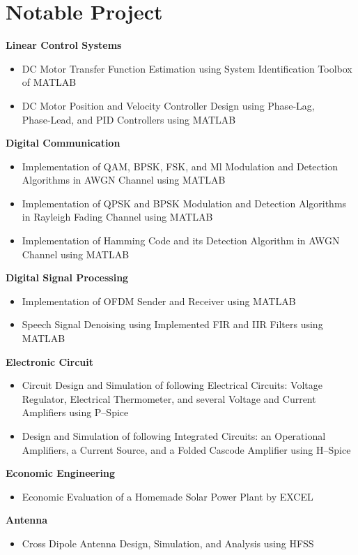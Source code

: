 \documentclass[11pt,a4paper,sans]{moderncv}        %
\begin{document}
\section{Notable Project}
 {}{\textbf{Linear Control Systems}}
\begin{itemize}
    \item {DC Motor Transfer Function Estimation using System Identification Toolbox of MATLAB}
    \item {DC Motor Position and Velocity Controller Design using Phase‑Lag, Phase‑Lead, and PID Controllers using MATLAB}
\end{itemize}
\newpage
\vspace{2 mm}
{}{\textbf{Digital Communication}}
\begin{itemize}
    \item {Implementation of QAM, BPSK, FSK, and Ml Modulation and Detection Algorithms in AWGN Channel using MATLAB}
    \item {Implementation of QPSK and BPSK Modulation and Detection Algorithms in Rayleigh Fading Channel using MATLAB}
    \item{Implementation of Hamming Code and its Detection Algorithm in AWGN Channel using MATLAB}
\end{itemize}
\vspace{2 mm}
{}{\textbf{Digital Signal Processing}}
\begin{itemize}
    \item {Implementation of OFDM Sender and Receiver using MATLAB}
    \item {Speech Signal Denoising using Implemented FIR and IIR Filters using MATLAB}
\end{itemize}
\vspace{2 mm}
{}{\textbf{Electronic Circuit}}
\begin{itemize}
    \item {Circuit Design and Simulation of following Electrical Circuits: Voltage Regulator, Electrical Thermometer, and several Voltage and Current Amplifiers using P–Spice}
    \item {Design and Simulation of following Integrated Circuits: an Operational Amplifiers, a Current Source, and a Folded Cascode Amplifier using H–Spice}
\end{itemize}
\vspace{2 mm}
{}{\textbf{Economic Engineering}}
\begin{itemize}
    \item {Economic Evaluation of a Homemade Solar Power Plant by EXCEL}
\end{itemize}
\vspace{2 mm}
{}{\textbf{Antenna}}
\begin{itemize}
    \item {Cross Dipole Antenna Design, Simulation, and Analysis using HFSS}
\end{itemize}
\end{document}
